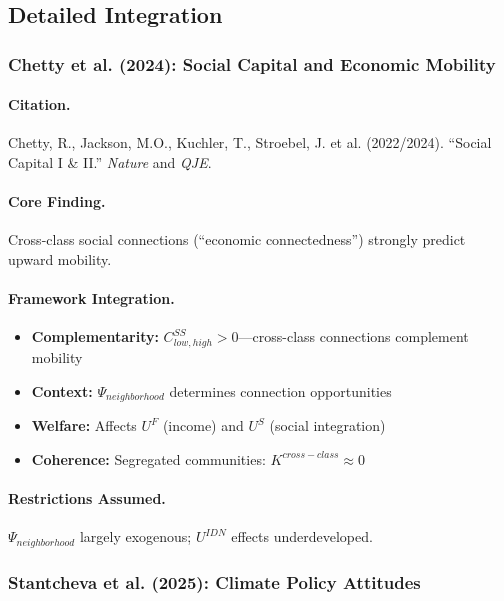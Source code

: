 \documentclass[12pt,a4paper]{article}
\begin{document}
\subsection{Detailed Integration}

\subsubsection{Chetty et al. (2024): Social Capital and Economic Mobility}

\paragraph{Citation.}
Chetty, R., Jackson, M.O., Kuchler, T., Stroebel, J. et al. (2022/2024).
``Social Capital I \& II.'' \emph{Nature} and \emph{QJE}.

\paragraph{Core Finding.}
Cross-class social connections (``economic connectedness'') strongly predict
upward mobility.

\paragraph{Framework Integration.}
\begin{itemize}
  \item \textbf{Complementarity:} $C^{SS}_{low,high} > 0$---cross-class connections
        complement mobility
  \item \textbf{Context:} $\Psi_{neighborhood}$ determines connection opportunities
  \item \textbf{Welfare:} Affects $U^F$ (income) and $U^S$ (social integration)
  \item \textbf{Coherence:} Segregated communities: $K^{cross-class} \approx 0$
\end{itemize}

\paragraph{Restrictions Assumed.}
$\Psi_{neighborhood}$ largely exogenous; $U^{IDN}$ effects underdeveloped.

\subsubsection{Stantcheva et al. (2025): Climate Policy Attitudes}
\end{document}
